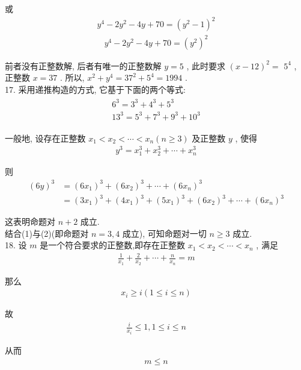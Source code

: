 或
\begin{align*}
	y^{4}-2 y^{2}-4 y+70=\left(y^{2}-1\right)^{2}
\end{align*}
\begin{align*}
	y^{4}-2 y^{2}-4 y+70=\left(y^{2}\right)^{2}
\end{align*}

前者没有正整数解, 后者有唯一的正整数解 $y=5$ , 此时要求 $(x-12)^{2}=$ $5^{4}$ , 正整数 $x=37$ . 所以,  $x^{2}+y^{4}=37^{2}+5^{4}=1994$ . \\
17. 采用递推构造的方式, 它基于下面的两个等式: 
\begin{align*}
	\begin{gathered}
		6^{3}=3^{3}+4^{3}+5^{3} \\
		13^{3}=5^{3}+7^{3}+9^{3}+10^{3}
	\end{gathered}
\end{align*}

一般地, 设存在正整数 $x_{1}<x_{2}<\cdots<x_{n}(n \geqslant 3)$ 及正整数 $y$ , 使得
\begin{align*}
	y^{3}=x_{1}^{3}+x_{2}^{3}+\cdots+x_{n}^{3}
\end{align*}

则\begin{align}
	(6 y)^{3} & =\left(6 x_{1}\right)^{3}+\left(6 x_{2}\right)^{3}+\cdots+\left(6 x_{n}\right)^{3}                                                   \\
	          & =\left(3 x_{1}\right)^{3}+\left(4 x_{1}\right)^{3}+\left(5 x_{1}\right)^{3}+\left(6 x_{2}\right)^{3}+\cdots+\left(6 x_{n}\right)^{3}
\end{align}

这表明命题对 $n+2$ 成立. \\
结合(1)与(2)(即命题对 $n=3 ,  4$ 成立), 可知命题对一切 $n \geqslant 3$ 成立. \\
18. 设 $m$ 是一个符合要求的正整数,即存在正整数 $x_{1}<x_{2}<\cdots<x_{n}$ , 满足
\begin{align*}
	\frac{1}{x_{1}}+\frac{2}{x_{2}}+\cdots+\frac{n}{x_{n}}=m
\end{align*}

那么
\begin{align*}
	x_{i} \geqslant i(1 \leqslant i \leqslant n)
\end{align*}

故
\begin{align*}
	\frac{i}{x_{i}} \leqslant 1,1 \leqslant i \leqslant n
\end{align*}

从而
\begin{align*}
	m \leqslant n
\end{align*}

